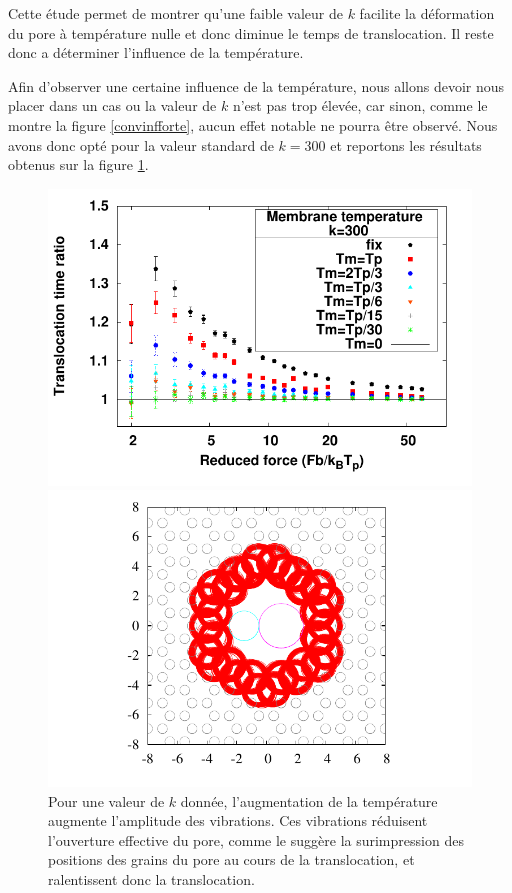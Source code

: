 Cette étude permet de montrer qu'une faible valeur de $k$ facilite la déformation du pore à température nulle et donc diminue le temps de translocation. Il reste donc a déterminer l'influence de la température.

\newpage

Afin d’observer une certaine influence de la température, nous allons devoir nous placer dans un cas ou la valeur de $k$ n'est pas trop élevée, car sinon, comme le montre la figure \ref{convinfforte}, aucun effet notable ne pourra être observé. Nous avons donc opté pour la valeur standard de $k=300$ et reportons les résultats obtenus sur la figure \ref{influencetemperature}.


\begin{figure}[H]
\includegraphics[width=\textwidth]{compkstandarttonotempdifferenttemp.pdf} 
\begin{minipage}{0.63\linewidth}
\includegraphics[width=\textwidth]{poreareawtempknorm.pdf}
\end{minipage}
\begin{minipage}{0.37\linewidth} 
\caption[Influence de la température]{Pour une valeur de $k$ donnée, l'augmentation de la température augmente l'amplitude des vibrations. Ces vibrations réduisent l'ouverture effective du pore, comme le suggère la surimpression des positions des grains du pore au cours de la translocation, et ralentissent donc la translocation.}
\label{influencetemperature}
\end{minipage}
\end{figure}


